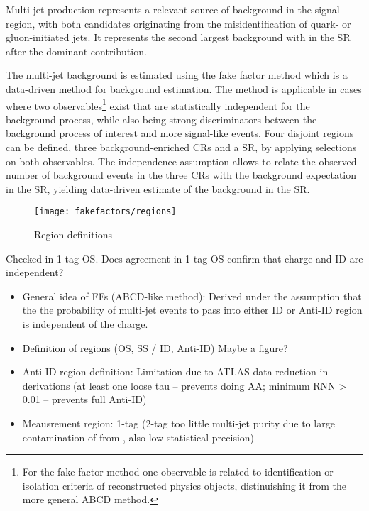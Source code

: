 \label{sec:hadhad_multijet}

Multi-jet production represents a relevant source of background in the
\hadhad signal region, with both \tauhadvis candidates originating
from the misidentification of quark- or gluon-initiated jets. It
represents the second largest background with \faketauhadvis in the
\hadhad SR after the dominant \ttbarFakes contribution.

The multi-jet background is estimated using the fake factor method
which is a data-driven method for background estimation. The method is
applicable in cases where two observables\footnote{For the fake factor
  method one observable is related to identification or isolation
  criteria of reconstructed physics objects, distinuishing it from the
  more general ABCD method.} exist that are statistically independent
for the background process, while also being strong discriminators
between the background process of interest and more signal-like
events. Four disjoint regions can be defined, three
background-enriched CRs and a SR, by applying selections on both
observables. The independence assumption allows to relate the observed
number of background events in the three CRs with the background
expectation in the SR, yielding data-driven estimate of the background
in the SR.

\begin{figure}[htbp]
  \centering

  \texttt{[image: fakefactors/regions]}

  \caption{Region definitions}
  \label{fig:fakefactor_regions}
\end{figure}

Checked in 1-tag OS. Does agreement in 1-tag OS confirm that charge
and ID are independent?

\begin{itemize}
\item General idea of FFs (ABCD-like method): Derived under the
  assumption that the the probability of multi-jet events to pass into
  either ID or Anti-ID region is independent of the charge.

\item Definition of regions (OS, SS / ID, Anti-ID) Maybe a figure?

\item Anti-ID region definition: Limitation due to ATLAS data
  reduction in derivations (at least one loose tau -- prevents doing
  AA; minimum RNN > 0.01 -- prevents full Anti-ID)

\item Meausrement region: 1-tag (2-tag too little multi-jet purity due
  to large contamination of \faketauhadvis from \ttbar, also low statistical precision)

\end{itemize}












